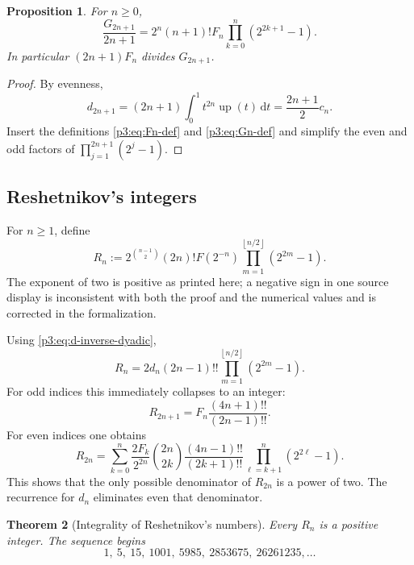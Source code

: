 \documentclass[11pt]{article}
\numberwithin{equation}{section}
\newtheorem{theorem}{Theorem}[section]
\newtheorem{proposition}[theorem]{Proposition}
\theoremstyle{definition}
\theoremstyle{remark}
\newcommand{\upf}{\operatorname{up}}
\newcommand{\dd}{\,\mathrm d}
\newcommand{\floor}[1]{\left\lfloor#1\right\rfloor}
\begin{document}
\begin{proposition}\label{p3:prop:F-G-relation}
For $n\ge0$,
\begin{equation}\label{p3:eq:F-G-relation}
 \frac{G_{2n+1}}{2n+1}
 =2^n(n+1)!F_n\prod_{k=0}^{n}(2^{2k+1}-1).
\end{equation}
In particular $(2n+1)F_n$ divides $G_{2n+1}$.
\end{proposition}

\begin{proof}
By evenness,
\[
 d_{2n+1}=(2n+1)\int_0^1t^{2n}\upf(t)\dd t
 =\frac{2n+1}{2}c_n.
\]
Insert the definitions \eqref{p3:eq:Fn-def} and \eqref{p3:eq:Gn-def} and simplify the even and odd factors of $\prod_{j=1}^{2n+1}(2^j-1)$.
\end{proof}

\subsection{Reshetnikov's integers}

For $n\ge1$, define
\begin{equation}\label{p3:eq:Rn-def}
 R_n:=2^{\binom{n-1}{2}}(2n)!F(2^{-n})
       \prod_{m=1}^{\floor{n/2}}(2^{2m}-1).
\end{equation}
The exponent of two is positive as printed here; a negative sign in one source display is inconsistent with both the proof and the numerical values and is corrected in the formalization.

Using \eqref{p3:eq:d-inverse-dyadic},
\begin{equation}\label{p3:eq:Rn-dn}
 R_n=2d_n(2n-1)!!\prod_{m=1}^{\floor{n/2}}(2^{2m}-1).
\end{equation}
For odd indices this immediately collapses to an integer:
\begin{equation}\label{p3:eq:Rodd}
 R_{2n+1}=F_n\frac{(4n+1)!!}{(2n-1)!!}.
\end{equation}
For even indices one obtains
\begin{equation}\label{p3:eq:Reven-sum}
 R_{2n}=\sum_{k=0}^{n}\frac{2F_k}{2^{2n}}\binom{2n}{2k}
 \frac{(4n-1)!!}{(2k+1)!!}
 \prod_{\ell=k+1}^{n}(2^{2\ell}-1).
\end{equation}
This shows that the only possible denominator of $R_{2n}$ is a power of two.  The recurrence for $d_n$ eliminates even that denominator.

\begin{theorem}[Integrality of Reshetnikov's numbers]\label{p3:thm:Rn-integral}
Every $R_n$ is a positive integer.  The sequence begins
\begin{equation}\label{p3:eq:Rn-values}
 1,\ 5,\ 15,\ 1001,\ 5985,\ 2853675,\ 26261235,\ldots
\end{equation}
\end{theorem}
\end{document}
